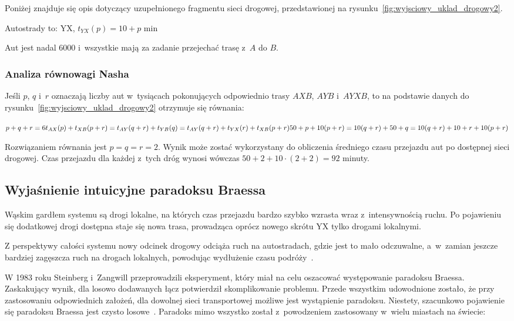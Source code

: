 \documentclass[twoside,12pt]{report}
\begin{document}
Poniżej znajduje się opis dotyczący uzupełnionego fragmentu sieci drogowej, przedstawionej na rysunku~\ref{fig:wyjsciowy_uklad_drogowy2}.

Autostrady to:\newline
YX, $t_{YX}(p) =  10 + p$ min\newline

Aut jest nadal 6000 i~wszystkie mają za zadanie przejechać trasę z~$A$ do $B$.

\subsubsection{Analiza równowagi Nasha}
Jeśli $p$, $q$ i~$r$ oznaczają liczby aut w~tysiącach pokonujących odpowiednio trasy $AXB$, $AYB$ i~$AYXB$, to na podstawie danych do rysunku~\ref{fig:wyjsciowy_uklad_drogowy2} otrzymuje się równania:

\begin{center}
\begin{math}
p+q+r = 6 \newline
t_{AX}(p)+t_{XB}(p+r) = t_{AY}(q+r) + t_{YB}(q) = t_{AY}(q+r)+t_{YX}(r)+t_{XB}(p+r)\newline
50+p+10(p+r) = 10(q+r)+50+q = 10(q+r)+ 10 + r + 10(p+r)\newline
\end{math}
\end{center}

Rozwiązaniem równania jest $p=q=r=2$. Wynik może zostać wykorzystany do obliczenia średniego czasu przejazdu aut po dostępnej sieci drogowej. Czas przejazdu dla każdej z~tych dróg wynosi wówczas $50+2+10 \cdot (2+2)=92$ minuty.

\subsection{Wyjaśnienie intuicyjne paradoksu Braessa}
Wąskim gardłem systemu są drogi lokalne, na których czas przejazdu bardzo szybko wzrasta wraz z~intensywnością ruchu. Po pojawieniu się dodatkowej drogi dostępna staje się nowa trasa, prowadząca oprócz nowego skrótu YX tylko drogami lokalnymi.

Z perspektywy całości systemu nowy odcinek drogowy odciąża ruch na autostradach, gdzie jest to mało odczuwalne, a~w~zamian jeszcze bardziej zagęszcza ruch na drogach lokalnych, powodując wydłużenie czasu podróży~\cite{conference}.

W 1983 roku Steinberg i~Zangwill przeprowadzili eksperyment, który miał na celu oszacować występowanie paradoksu Braessa. Zaskakujący wynik, dla losowo dodawanych łącz potwierdził skomplikowanie problemu. Przede wszystkim udowodnione zostało, że przy zastosowaniu odpowiednich założeń, dla dowolnej sieci transportowej możliwe jest wystąpienie paradoksu. Niestety, szacunkowo pojawienie się paradoksu Braessa jest czysto losowe~\cite{paradox-dowod}. Paradoks mimo wszystko został z~powodzeniem zastosowany w~wielu miastach na świecie:
\end{document}
